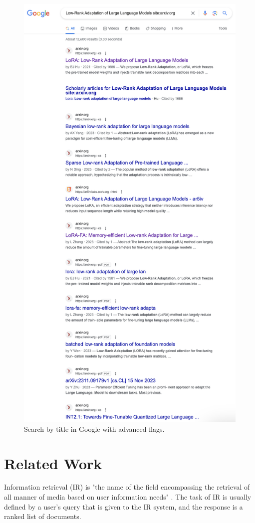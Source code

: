 \documentclass{article}
\begin{document}
    \begin{figure}[H]
        \centering
        \includegraphics[width=0.65\linewidth]{img/search_google_advanced.png}
        \caption{Search by title in Google with advanced flags.}
        \label{fig:advanced-google-search}
    \end{figure}

\section{Related Work}\label{sec:related}

    Information retrieval (IR) is "the name of the field encompassing the retrieval of all manner of media based on user information needs" \cite{jurafsky}. The task of IR is usually defined by a user's query that is given to the IR system, and the response is a ranked list of documents. 
\end{document}
